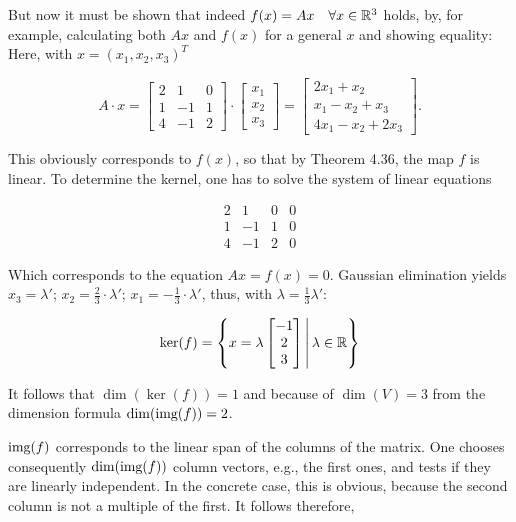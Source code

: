 But now it must be shown that indeed \(f(x) = Ax \quad \forall x \in \mathbb{R}^3\) holds, by, 
for example, calculating both \(Ax\) and \(f(x)\) for a 
general \(x\) and showing equality: Here, with \(x = {(x_1, x_2, x_3)}^T\)

\[
    A \cdot x =
    \begin{bmatrix}
    2 & 1 & 0 \\
    1 & -1 & 1 \\
    4 & -1 & 2
    \end{bmatrix}
    \cdot
    \begin{bmatrix}
    x_1 \\
    x_2 \\
    x_3
    \end{bmatrix} =
    \begin{bmatrix}
    2x_1 + x_2 \\
    x_1 - x_2 + x_3 \\
    4x_1 - x_2 + 2x_3
    \end{bmatrix} .
\]

This obviously corresponds to \(f(x)\), so that by Theorem 4.36, the map \(f\) is linear. To determine the kernel, one has to solve the system of linear equations

\[
    \begin{array}{cccc}
    2 & 1 & 0 & 0 \\
    1 & -1 & 1 & 0 \\
    4 & -1 & 2 & 0
    \end{array}
\]

Which corresponds to the equation \(Ax = f(x) = 0\). Gaussian 
elimination yields \(x_3 = \lambda'\); 
\(x_2 = \frac{2}{3} \cdot \lambda'\); \(x_1 = -\frac{1}{3} \cdot \lambda'\), 
thus, with \(\lambda = \frac{1}{3} \lambda'\):

\[
    \ker(f) =
    \left\{
    x = \lambda
    \begin{bmatrix}
    -1 \\
    2 \\
    3
    \end{bmatrix}
    \, \middle| \, \lambda \in \mathbb{R}
    \right\}
\]

It follows that \(\dim(\ker(f)) = 1\) and because of \(\dim(V) = 3\) from the dimension 
formula \(\dim(\text{img}(f)) = 2\). 

\(\text{img}(f)\) corresponds to the linear span of the columns of the matrix. One chooses consequently 
\(\dim(\text{img}(f))\) column vectors, e.g., the first ones, and tests if they are linearly independent. 
In the concrete case, this is obvious, because the second column is 
not a multiple of the first. It follows therefore,


